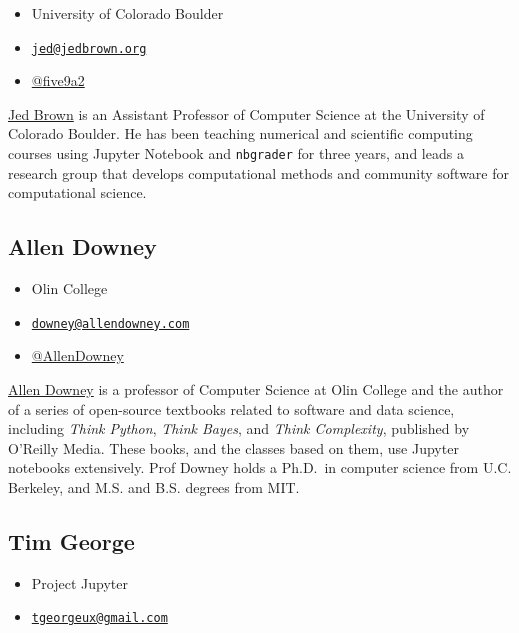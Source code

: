 \documentclass[]{book}
\providecommand{\tightlist}{%
  \setlength{\itemsep}{0pt}\setlength{\parskip}{0pt}}
\begin{document}
\begin{itemize}
\tightlist
\item
  University of Colorado Boulder
\item
  \href{mailto:jed@jedbrown.org}{\nolinkurl{jed@jedbrown.org}}
\item
  \href{https://twitter.com/five9a2}{@five9a2}
\end{itemize}

\href{https://jedbrown.org/}{Jed Brown} is an Assistant Professor of Computer Science
at the University of Colorado Boulder. He has been teaching numerical and scientific
computing courses using Jupyter Notebook and \texttt{nbgrader} for three years, and leads a
research group that develops computational methods and community software for
computational science.

\hypertarget{allen-downey}{%
\subsection*{Allen Downey}\label{allen-downey}}

\begin{itemize}
\tightlist
\item
  Olin College
\item
  \href{mailto:downey@allendowney.com}{\nolinkurl{downey@allendowney.com}}
\item
  \href{https://twitter.com/AllenDowney}{@AllenDowney}
\end{itemize}

\href{http://www.allendowney.com/wp/}{Allen Downey} is a professor of Computer Science
at Olin College and the author of a series of open-source textbooks related to software
and data science, including \emph{Think Python}, \emph{Think Bayes}, and \emph{Think Complexity},
published by O'Reilly Media. These books, and the classes based on them, use
Jupyter notebooks extensively. Prof Downey holds a Ph.D.~in computer science
from U.C. Berkeley, and M.S. and B.S. degrees from MIT.

\hypertarget{tim-george}{%
\subsection*{Tim George}\label{tim-george}}

\begin{itemize}
\tightlist
\item
  Project Jupyter
\item
  \href{mailto:tgeorgeux@gmail.com}{\nolinkurl{tgeorgeux@gmail.com}}
\end{itemize}
\end{document}

